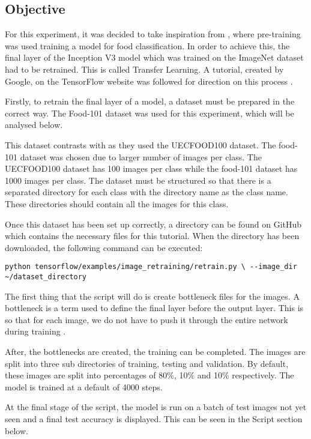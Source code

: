 \subsection*{Objective}
For this experiment, it was decided to take inspiration from
\parencite{yanaiFood}, where pre-training was used training a model for food
classification. In order to achieve this, the final layer of the
Inception V3 model which was trained on the ImageNet dataset had to be retrained. This is called
Transfer Learning.
A tutorial, created by Google, on the TensorFlow website was followed
for direction on this process \parencite{retrainInception}.

Firstly, to retrain the final layer of a model, a dataset must be
prepared in the correct way. The Food-101 dataset \parencite{food101}
was used for this experiment, which will be analysed below.

This dataset contrasts with \parencite{yanaiFood} as they used the UECFOOD100 dataset.
The food-101 dataset was chosen due to larger number of images per class.
The UECFOOD100 dataset has 100 images per class while the food-101 dataset has 1000 images per class.
The dataset must be structured so that
there is a separated directory for each class with the directory name as the class
name. These directories should contain all the images for this class. 

Once this dataset has been set up correctly, a directory can be found on GitHub
which contains the necessary files for this tutorial. When the directory has
been downloaded, the following command can be executed:
\begin{lstlisting}[style=Command]
python tensorflow/examples/image_retraining/retrain.py \ --image_dir
~/dataset_directory
\end{lstlisting}

The first thing that the script will do is create bottleneck files for the
images. A bottleneck is a term used to define the final layer before the output
layer. This is so that for each image, we do not have to push it through the
entire network during training \parencite{retrainInception}.

After, the bottlenecks are created, the training can be completed. The images
are split into three sub directories of training, testing and validation. By
default, these images are split into percentages of 80\%, 10\% and 10\%
respectively. The model is trained at a default of 4000 steps. 

At the final stage of the script, the model is run on a batch of test images not
yet seen and a final test accuracy is displayed. This can be seen in the Script
section below.

